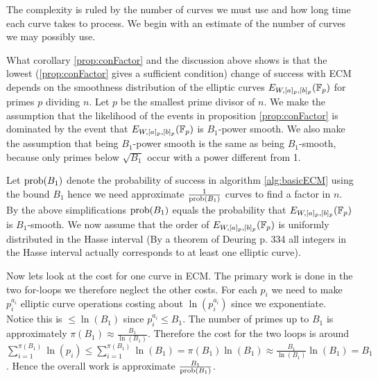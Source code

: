 The complexity is ruled by the number of curves we must use and how long time each curve takes to process. We begin with an estimate of the number of curves we may possibly use. 

What corollary \ref{prop:conFactor} and the discussion above shows is that the lowest (\ref{prop:conFactor} gives a sufficient condition) change of success with ECM depends on the smoothness distribution of the elliptic curves $E_{W,[a]_p,[b]_p}(\mathbb{F}_p)$ for primes $p$ dividing $n$. Let $p$ be the smallest prime divisor of $n$. We make the assumption that the likelihood of the events in proposition \ref{prop:conFactor} is dominated by the event that $E_{W,[a]_p,[b]_p}(\mathbb{F}_p)$ is $B_1$-power smooth. We also make the assumption that being $B_1$-power smooth is the same as being $B_1$-smooth, because only primes below $\sqrt{B_1}$ occur with a power different from 1. 

Let $\text{prob}(B_1)$ denote the probability of success in algorithm \ref{alg:basicECM} using the bound $B_1$ hence we need approximate $\frac{1}{\text{prob}(B_1)}$ curves to find a factor in $n$. By the above simplifications $\text{prob}(B_1)$ equals the probability that $E_{W,[a]_p,[b]_p}(\mathbb{F}_p)$ is $B_1$-smooth. We now assume that the order of $E_{W,[a]_p,[b]_p}(\mathbb{F}_p)$ is uniformly distributed in the Hasse interval (By a theorem of Deuring \cite{pomeranceEt.al} p. 334 all integers in the Hasse interval actually corresponds to at least one elliptic curve). 

Now lets look at the cost for one curve in ECM. The primary work is done in the two for-loops we therefore neglect the other costs. For each $p_i$ we need to make $p_i^{a_i}$ elliptic curve operations costing about $\ln(p_i^{a_i})$ since we exponentiate. Notice this is $\leq \ln(B_1)$ since $p_i^{a_i}\leq B_1$. The number of primes up to $B_1$ is approximately $\pi(B_1)\approx\frac{B_1}{\ln(B_1)}$. Therefore the cost for the two loops is around $\sum_{i=1}^{\pi(B_1)} \ln(p_i)\leq \sum_{i=1}^{\pi(B_1)} \ln(B_1)=\pi(B_1)\ln(B_1)\approx\frac{B_1}{\ln(B_1)}\ln(B_1)=B_1$. Hence the overall work is approximate $\frac{B_1}{\text{prob}(B_1)}$. 

